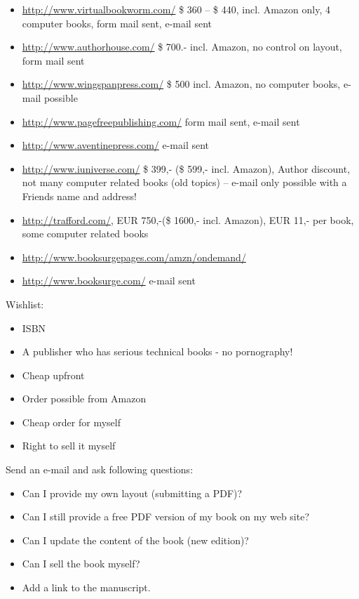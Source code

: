 \begin{itemize}
    \item \url{http://www.virtualbookworm.com/} \$ 360 -- \$ 440, incl. Amazon only, 4 computer
    books, form mail sent, e-mail sent
    \item \url{http://www.authorhouse.com/} \$ 700.- incl. Amazon,
    no control on layout, form mail sent
    \item \url{http://www.wingspanpress.com/} \$ 500 incl. Amazon,
    no computer books, e-mail possible
    \item \url{http://www.pagefreepublishing.com/} form mail sent,
    e-mail sent
    \item \url{http://www.aventinepress.com/} e-mail sent
    \item \url{http://www.iuniverse.com/} \$ 399,- (\$ 599,- incl.
    Amazon), Author discount, not many computer related books (old
    topics) -- e-mail only possible with a Friends name and address!
    \item \url{http://trafford.com/}, EUR 750,-(\$ 1600,- incl. Amazon), EUR 11,- per
    book, some computer related books
    \item \url{http://www.booksurgepages.com/amzn/ondemand/}
    \item \url{http://www.booksurge.com/} e-mail sent
\end{itemize}

Wishlist:
\begin{itemize}
    \item ISBN
    \item A publisher who has serious technical books - no pornography!
    \item Cheap upfront
    \item Order possible from Amazon
    \item Cheap order for myself
    \item Right to sell it myself
\end{itemize}

Send an e-mail and ask following questions:
\begin{itemize}
    \item Can I provide my own layout (submitting a PDF)?
    \item Can I still provide a free PDF version of my book on my
    web site?
    \item Can I update the content of the book (new edition)?
    \item Can I sell the book myself?
    \item Add a link to the manuscript.
\end{itemize}

